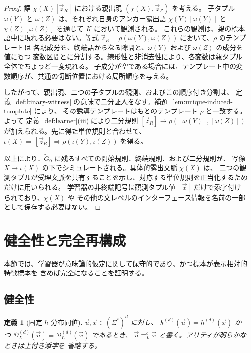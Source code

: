 \documentclass[11pt,a4paper]{ltjsarticle}
\newtheorem{definition}[theorem]{定義}
\theoremstyle{remark}
\newcommand{\D}{\mathcal{D}}
\newcommand{\tuple}[1]{\vec{#1}}
\begin{document}
\begin{proof}
語 \(\chi(X)[\tuple z_R]\) における親出現 \((\chi(X),\tuple z_R)\) を考える。
子タプル \(\omega(Y)\) と \(\omega(Z)\) は、それぞれ自身のアンカー露出語
\(\chi(Y)[\omega(Y)]\) と \(\chi(Z)[\omega(Z)]\) を通じて \(K\) において観測される。
これらの観測は、親の標本語中に現れる必要はない。等式
\(\tuple z_R=\rho(\omega(Y),\omega(Z))\) において、\(\rho\) のテンプレートは
各親成分を、終端語からなる隙間と、\(\omega(Y)\) および \(\omega(Z)\) の成分を値にもつ
変数区間とに分割する。線形性と非消去性により、各変数は親タプル全体でちょうど一度現れる。
子成分が空である場合には、テンプレート中の変数順序が、共通の切断位置における局所順序を与える。

したがって、親出現、二つの子タプルの観測、およびこの順序付き分割は、
定義~\ref{def:binary-witness} の意味で二分証人をなす。補題~\ref{lem:unique-induced-template} により、
その誘導テンプレートはもとのテンプレート \(\rho\) と一致する。よって
定義~\ref{def:learner}(iii) により二分規則
\([\tuple z_R]\to\rho([\omega(Y)],[\omega(Z)])\) が加えられる。先に得た単位規則と合わせて、
\(\iota(X)\Rightarrow[\tuple z_R]\Rightarrow\rho(\iota(Y),\iota(Z))\) を得る。

以上により、\(\widetilde G_0\) に残るすべての開始規則、終端規則、および二分規則が、
写像 \(X\mapsto\iota(X)\) の下でシミュレートされる。具体的露出文脈 \(\chi(X)\) は、
二つの観測タプルが受理文脈を共有することを示し、対応する単位規則を正当化するためだけに用いられる。
学習器の非終端記号は観測タプル値 \([\tuple x]\) だけで添字付けられており、\(\chi(X)\) や
その他の文レベルのインターフェース情報を名前の一部として保存する必要はない。
\end{proof}


\section{健全性と完全再構成}
\label{sec:exact}

本節では、学習器が意味論的仮定に関して保守的であり、かつ標本が表示相対的特徴標本を
含めば完全になることを証明する。

\subsection{健全性}
\label{sec:soundness}

\begin{definition}[固定 \(h\) 分布同値]
\label{def:distributional-equivalence}
\(\tuple u,\tuple x\in(\Sigma^*)^d\) に対し、
\(h^{(d)}(\tuple u)=h^{(d)}(\tuple x)\) かつ
\(\D_L^{(d)}(\tuple u)=\D_L^{(d)}(\tuple x)\) であるとき、
\(\tuple u\equiv_L^d\tuple x\) と書く。アリティが明らかなときは上付き添字を
省略する。
\end{definition}
\end{document}

